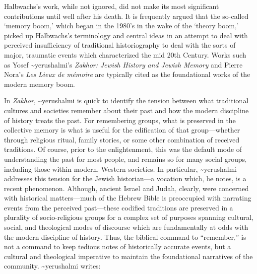 Halbwachs's work, while not ignored, did not make its most significant
contributions until well after his death. It is frequently argued that
the so-called `memory boom,' which began in the 1980's in the wake of
the `theory boom,' picked up Halbwachs's terminology and central ideas
in an attempt to deal with perceived insufficiency of traditional
historiography to deal with the sorts of major, traumatic events which
characterized the mid 20th
Century.\autocites[1--2]{galinsky_galinsky2016}[See also][29--36. One
cannot help but speculate that---at least in the English-speaking
world---the translation of \emph{The Collective Memory} in 1980
contributed to the popularity of Halbwachs's
terminology.]{olick_olick-etal2011} Works such as Yosef
\textasciitilde{}yerushalmi's \emph{Zakhor: Jewish History and Jewish
Memory} and Pierre Nora's \emph{Les Lieux de mémoire} are typically
cited as the foundational works of the modern memory
boom.\autocites[112--113]{klein2011}{yerushalmi1989}[Nora's massive
project has been abridged and translated into English as][]{nora1996}

In \emph{Zakhor}, \textasciitilde{}yerushalmi is quick to identify the
tension between what traditional cultures and societies remember about
their past and how the modern discipline of history treats the past. For
remembering groups, what is preserved in the collective memory is what
is useful for the edification of that group---whether through religious
ritual, family stories, or some other combination of received
traditions. Of course, prior to the enlightenment, this was the default
mode of understanding the past for most people, and remains so for many
social groups, including those within modern, Western societies. In
particular, \textasciitilde{}yerushalmi addresses this tension for the
Jewish historian---a vocation which, he notes, is a recent phenomenon.
Although, ancient Israel and Judah, clearly, were concerned with
historical matters---much of the Hebrew Bible is preoccupied with
narrating events from the perceived past---these codified traditions are
preserved in a plurality of socio-religious groups for a complex set of
purposes spanning cultural, social, and theological modes of discourse
which are fundamentally at odds with the modern discipline of history.
Thus, the biblical command to ``remember,'' is not a command to keep
tedious notes of historically accurate events, but a cultural and
theological imperative to maintain the foundational narratives of the
community. \textasciitilde{}yerushalmi writes:

